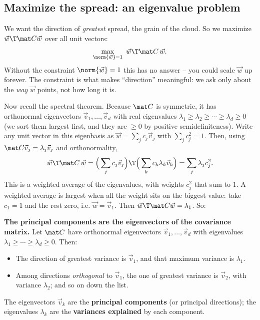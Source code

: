 \subsection{Maximize the spread: an eigenvalue problem}

We want the direction of \emph{greatest} spread, the grain of the cloud. So we
maximize $\vec w\T\mat C\vec w$ over all unit vectors:
\[
  \max_{\norm{\vec w}=1}\ \vec w\T\mat C\,\vec w .
\]
Without the constraint $\norm{\vec w}=1$ this has no answer -- you could scale
$\vec w$ up forever. The constraint is what makes ``direction'' meaningful: we ask
only about the \emph{way} $\vec w$ points, not how long it is.

Now recall the spectral theorem. Because $\mat C$ is symmetric, it has orthonormal
eigenvectors $\vec v_1,\dots,\vec v_d$ with real eigenvalues
$\lambda_1\ge\lambda_2\ge\cdots\ge\lambda_d\ge0$ (we sort them largest first, and
they are $\ge 0$ by positive semidefiniteness). Write any unit vector in this
eigenbasis as $\vec w=\sum_j c_j\vec v_j$ with $\sum_j c_j^2=1$. Then, using
$\mat C\vec v_j=\lambda_j\vec v_j$ and orthonormality,
\[
  \vec w\T\mat C\,\vec w
  =\Big(\sum_j c_j\vec v_j\Big)\T\Big(\sum_k c_k\lambda_k\vec v_k\Big)
  =\sum_j \lambda_j c_j^2 .
\]
This is a weighted average of the eigenvalues, with weights $c_j^2$ that sum to $1$.
A weighted average is largest when all the weight sits on the biggest value: take
$c_1=1$ and the rest zero, i.e. $\vec w=\vec v_1$. Then $\vec w\T\mat C\vec
w=\lambda_1$. So:

\begin{formalbox}\label{ch30:pca-thm}
\textbf{The principal components are the eigenvectors of the covariance matrix.}
Let $\mat C$ have orthonormal eigenvectors $\vec v_1,\dots,\vec v_d$ with
eigenvalues $\lambda_1\ge\cdots\ge\lambda_d\ge0$. Then:
\begin{itemize}
  \item The direction of greatest variance is $\vec v_1$, and that maximum variance
        is $\lambda_1$.
  \item Among directions \emph{orthogonal} to $\vec v_1$, the one of greatest
        variance is $\vec v_2$, with variance $\lambda_2$; and so on down the list.
\end{itemize}
The eigenvectors $\vec v_k$ are the \textbf{principal components} (or principal
directions); the eigenvalues $\lambda_k$ are the \textbf{variances explained} by
each component.
\end{formalbox}

